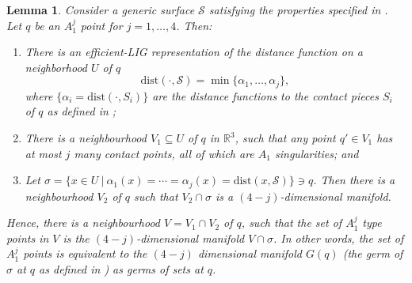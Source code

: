\documentclass[11pt]{article}
\newcommand{\R}{\mathbb{R}}
\newcommand{\dist}{\mathrm{dist}}
\newcommand{\Surf}{\mathcal{S}}
\theoremstyle{plain}
\newtheorem{lem}{Lemma}
\theoremstyle{definition}
\theoremstyle{remark}
\begin{document}
	\begin{lem} \label{lem:A1_manifolds} Consider a generic surface $\Surf$ satisfying the properties specified in . Let $q$ be an $A_1^j$ point for $j = 1,\ldots,4$. Then: 
		\begin{enumerate}
			\item There is an efficient-LIG representation of the distance function on a neighborhood $U$ of $q$
			$$ 
			\dist(\cdot, \Surf) = \min \{ \alpha_1, \ldots, \alpha_j\},
			$$
			where $\{\alpha_i = \dist(\cdot, S_i) \}$ are the distance functions to the contact pieces $S_i$ of $q$ as defined in ;
			\item There is a neighbourhood $V_1 \subseteq U$ of $q$ in $\R^3$, such that any point $q' \in V_1$ has at most $j$ many contact points, all of which are $A_1$ singularities; and 
			\item Let $\sigma = \{x \in U \ | \ \alpha_1(x) = \cdots = \alpha_j(x) = \dist(x, \Surf)\} \ni q$. Then there is a neighbourhood $V_2$ of $q$ such that $V_2 \cap \sigma $ is a $(4-j)$-dimensional manifold.
		\end{enumerate}
		Hence, there is a neighbourhood $V = V_1 \cap V_2$ of $q$, such that the set of $A_1^j$ type points in $V$ is the $(4-j)$-dimensional manifold $V \cap \sigma$. In other words, the set of $A_1^j$ points is equivalent to the $(4-j)$ dimensional manifold $G(q)$ (the germ of $\sigma$  at $q$ as defined in ) as germs of sets at $q$.
	\end{lem}
\end{document}
